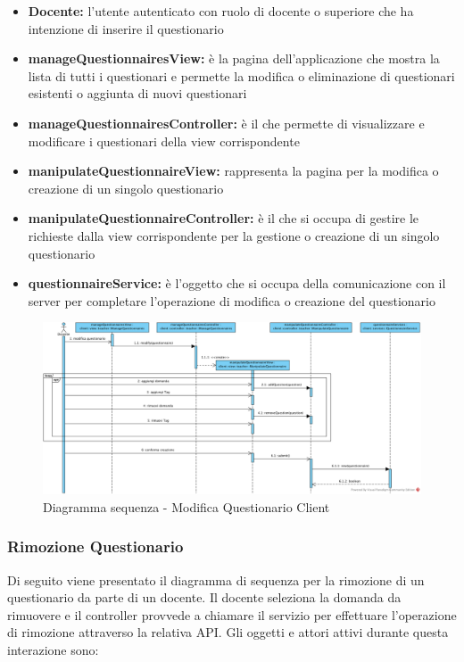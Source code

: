 \documentclass[12pt,a4paper]{article}
\begin{document}
\begin{itemize}
	\item \textbf{Docente:}	 l'utente autenticato con ruolo di docente o superiore che ha intenzione di inserire il questionario
	\item \textbf{manageQuestionnairesView:} è la pagina dell'applicazione che mostra la lista di tutti i questionari e permette la modifica o eliminazione di questionari esistenti o aggiunta di nuovi questionari
	\item \textbf{manageQuestionnairesController:} è il  che permette di visualizzare e modificare i questionari della view corrispondente
	\item \textbf{manipulateQuestionnaireView:} rappresenta la pagina per la modifica o creazione di un singolo questionario
	\item \textbf{manipulateQuestionnaireController:} è il  che si occupa di gestire le richieste dalla view corrispondente per la gestione o creazione di un singolo questionario
	\item \textbf{questionnaireService:} è l'oggetto che si occupa della comunicazione con il server per completare l'operazione di modifica o creazione del questionario
\end{itemize}

\begin{center}
	\begin{figure}[H]
		\centering \includegraphics[max width=\myheight, angle=90]{../img/diagrammiSequenza/modificaQuestionarioClient.png}
		\caption{Diagramma sequenza - Modifica Questionario Client}
	\end{figure}
\end{center}

\newpage
\subsubsection{Rimozione Questionario}
Di seguito viene presentato il diagramma di sequenza per la rimozione di un questionario da parte di un docente. Il docente seleziona la domanda da rimuovere e il controller provvede a chiamare il servizio per effettuare l'operazione di rimozione attraverso la relativa API. Gli oggetti e attori attivi durante questa interazione sono:
\end{document}
